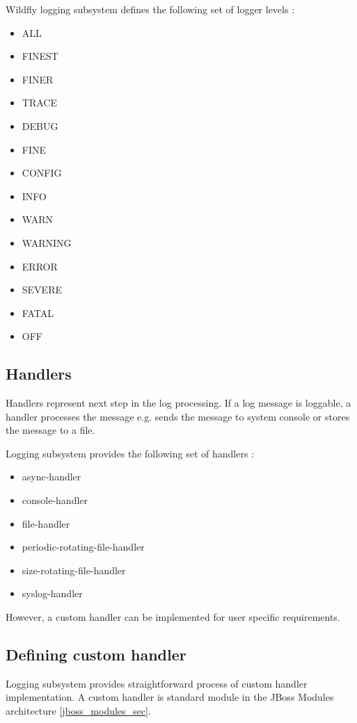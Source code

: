 \documentclass[12pt,oneside]{fithesis2}
\begin{document}
Wildfly logging subsystem defines the following set of logger levels \cite[Logging Configuration]{wildfly_doc}:

\begin{multicols}{2}
	\begin{itemize}
		\item ALL
		\item FINEST
		\item FINER
		\item TRACE
		\item DEBUG
		\item FINE
		\item CONFIG
		\item INFO
		\item WARN
		\item WARNING
		\item ERROR
		\item SEVERE
		\item FATAL
		\item OFF
	\end{itemize}
\end{multicols}

\subsection{Handlers}
Handlers represent next step in the log processing. If a log message is loggable, a handler processes the message e.g. sends the message to system console or stores the message to a file.

Logging subsystem provides the following set of handlers \cite[Logging Configuration]{wildfly_doc}:
\begin{itemize}
	\item async-handler
	\item console-handler
	\item file-handler
	\item periodic-rotating-file-handler
	\item size-rotating-file-handler
	\item syslog-handler
\end{itemize}

However, a custom handler can be implemented for user specific requirements.

\subsection{Defining custom handler}
Logging subsystem provides straightforward process of custom handler implementation. A custom handler is standard module in the JBoss Modules architecture \ref{jboss_modules_sec}.
\end{document}
